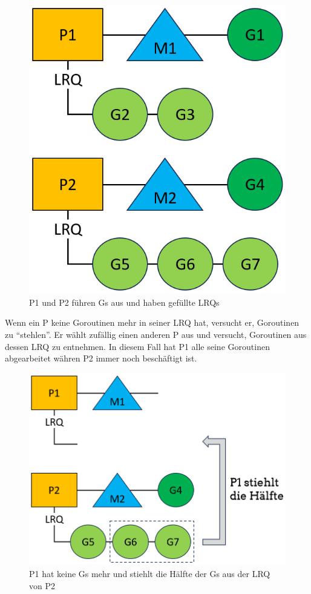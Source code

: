 \documentclass[fontsize=12pt,paper=a4,twoside=semi,parskip=half-,headsepline,headinclude]{scrreprt}
\begin{document}
\begin{figure}[h]
	\centering
	\includegraphics[scale=0.5]{figures/GoroutineWorkstealing1.png}
	\caption{P1 und P2 führen Gs aus und haben gefüllte LRQs}
	\label{fig:GoroutineWorkstealing1}
\end{figure}

Wenn ein P keine Goroutinen mehr in seiner LRQ hat, versucht er, Goroutinen zu ``stehlen''. Er wählt zufällig einen anderen P aus und versucht, Goroutinen aus dessen LRQ zu entnehmen. In diesem Fall hat P1 alle seine Goroutinen abgearbeitet währen P2 immer noch beschäftigt ist.

\begin{figure}[h]
	\centering
	\includegraphics[scale=0.5]{figures/GoroutineWorkstealing2.png}
	\caption{P1 hat keine Gs mehr und stiehlt die Hälfte der Gs aus der LRQ von P2}
	\label{fig:GoroutineWorkstealing2}
\end{figure}
\end{document}
